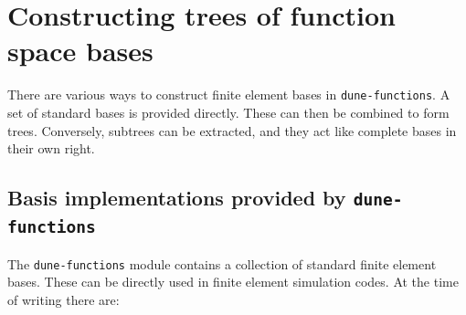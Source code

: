\documentclass[a4paper,10pt,headings=normal,bibliography=totoc]{scrartcl}
\newcommand{\dunemodule}[1]{\texttt{#1}}
\begin{document}
\section{Constructing trees of function space bases}

There are various ways to construct finite element bases in \dunemodule{dune-functions}.
A set of standard bases is provided directly.  These can then be combined to form trees.
Conversely, subtrees can be extracted, and they act like complete bases in their own right.

\subsection{Basis implementations provided by \texorpdfstring{\dunemodule{dune-functions}}{dune-functions}}
\label{subsec:available_bases}

The \dunemodule{dune-functions} module contains a collection of standard finite element bases.
These can be directly used in finite element simulation codes. At the time of writing there are:
\end{document}
